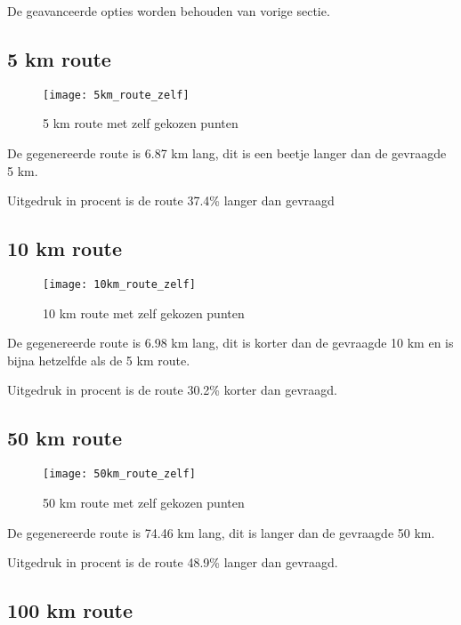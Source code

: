 De geavanceerde opties worden behouden van vorige sectie.

\subsection{5 km route}

\begin{figure}[H]
    \centering
    \texttt{[image: 5km\_route\_zelf]}
    \caption{5 km route met zelf gekozen punten}
    \label{fig:5km_route_zelf}

\end{figure}

De gegenereerde route is 6.87 km lang, dit is een beetje langer dan de gevraagde 5 km.

Uitgedruk in procent is de route 37.4\% langer dan gevraagd

\subsection{10 km route}

\begin{figure}[H]
    \centering
    \texttt{[image: 10km\_route\_zelf]}
    \caption{10 km route met zelf gekozen punten}
    \label{fig:10km_route_zelf}

\end{figure}

De gegenereerde route is 6.98 km lang, dit is korter dan de gevraagde 10 km en is bijna hetzelfde als de 5 km route.

Uitgedruk in procent is de route 30.2\% korter dan gevraagd.

\subsection{50 km route}

\begin{figure}[H]
    \centering
    \texttt{[image: 50km\_route\_zelf]}
    \caption{50 km route met zelf gekozen punten}
    \label{fig:50km_route_zelf}

\end{figure}

De gegenereerde route is 74.46 km lang, dit is langer dan de gevraagde 50 km.

Uitgedruk in procent is de route 48.9\% langer dan gevraagd.

\subsection{100 km route}

